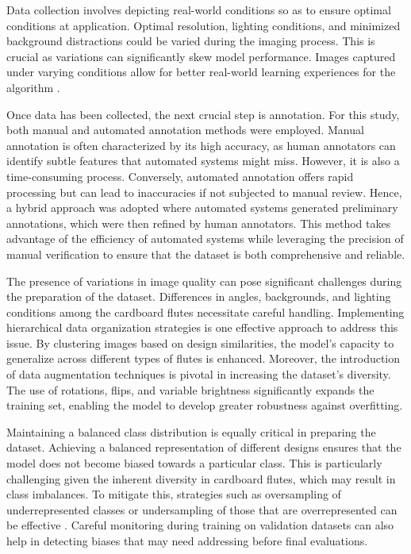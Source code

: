 Data collection involves depicting real-world conditions so as to ensure optimal conditions at application. Optimal resolution, lighting conditions, and minimized background distractions could be varied during the imaging process. This is crucial as variations can significantly skew model performance. Images captured under varying conditions allow for better real-world learning experiences for the algorithm \cite{everingham2010pascal}. 


Once data has been collected, the next crucial step is annotation. For this study, both manual and automated annotation methods were employed. Manual annotation is often characterized by its high accuracy, as human annotators can identify subtle features that automated systems might miss. However, it is also a time-consuming process. Conversely, automated annotation offers rapid processing but can lead to inaccuracies if not subjected to manual review. Hence, a hybrid approach was adopted where automated systems generated preliminary annotations, which were then refined by human annotators. This method takes advantage of the efficiency of automated systems while leveraging the precision of manual verification to ensure that the dataset is both comprehensive and reliable.



The presence of variations in image quality can pose significant challenges during the preparation of the dataset. Differences in angles, backgrounds, and lighting conditions among the cardboard flutes necessitate careful handling. Implementing hierarchical data organization strategies is one effective approach to address this issue. By clustering images based on design similarities, the model's capacity to generalize across different types of flutes is enhanced. Moreover, the introduction of data augmentation techniques is pivotal in increasing the dataset's diversity. The use of rotations, flips, and variable brightness significantly expands the training set, enabling the model to develop greater robustness against overfitting.



Maintaining a balanced class distribution is equally critical in preparing the dataset. Achieving a balanced representation of different designs ensures that the model does not become biased towards a particular class. This is particularly challenging given the inherent diversity in cardboard flutes, which may result in class imbalances. To mitigate this, strategies such as oversampling of underrepresented classes or undersampling of those that are overrepresented can be effective \cite{buda2018systematic}. Careful monitoring during training on validation datasets can also help in detecting biases that may need addressing before final evaluations.


